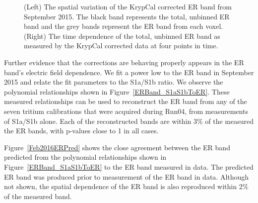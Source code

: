 \documentclass[a4paper,10pt,twocolumn]{article}
\begin{document}

\begin{figure} 
\centering
{}
\qquad
{}
\caption{ (Left) The spatial variation of the KrypCal corrected ER band from September 2015.  The black band represents the total, unbinned ER band and the grey bands represent the ER band from each voxel. (Right) The time dependence of the total, unbinned ER band as measured by the KrypCal corrected data at four points in time.}
\label{ERBandVariation}
\end{figure}

Further evidence that the corrections are behaving properly appears in the ER band's electric field dependence.  We fit a power low to the ER band in September 2015 and relate the fit parameters to the S1a/S1b ratio.  We observe the polynomial relationships shown in Figure~\ref{ERBand_S1aS1bToER}.  These measured relationships can be used to reconstruct the ER band from any of the seven tritium calibrations that were acquired during Run04, from measurements of S1a/S1b alone.  Each of the reconstructed bands are within 3\% of the measured the ER bands, with p-values close to 1 in all cases.  

Figure~\ref{Feb2016ERPred} shows the close agreement between the ER band predicted from the polynomial relationships shown in Figure~\ref{ERBand_S1aS1bToER} to the ER band measured in data.  The predicted ER band was produced prior to measurement of the ER band in data.  Although not shown, the spatial dependence of the ER band is also reproduced within 2\% of the measured band. 
\end{document}

